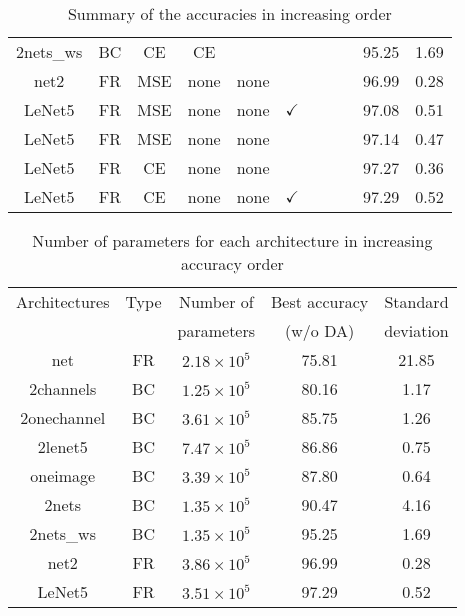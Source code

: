 \documentclass[10pt,conference,compsocconf]{IEEEtran}
\newcommand{\xmark}{\ding{55}}
\begin{document}
\begin{table}[H]
\begin{tabular}{|c 	|c		|c  			|c 					|c 				|c  				|c 				|c 			|c				|c 			|c|}
	2nets\_ws	& BC 	& CE 		& CE 				& \checkmark		& \xmark			& \xmark 		& \xmark		& \xmark			& 95.25		& 1.69 \\
	net2			& FR 	& MSE 		& none 				& none 			& \xmark			& \xmark 		& \xmark		& \checkmark		& 96.99		& 0.28 \\ 
	LeNet5 		& FR 	& MSE 		& none 				& none 			& $\checkmark$ 	& \xmark 		& \xmark		& \checkmark		& 97.08 		& 0.51 \\
	LeNet5 		& FR 	& MSE 		& none 				& none 			& \xmark 		& \xmark 		& \xmark 	& \checkmark		& 97.14 		& 0.47 \\
	LeNet5 		& FR 	& CE 		& none 				& none 			& \xmark 		& \xmark 		& \xmark 	& \checkmark		& 97.27 		& 0.36 \\ %
	LeNet5 		& FR 	& CE 		& none 				& none 			& $\checkmark$ 	& \xmark 		& \xmark		& \checkmark		& 97.29 		& 0.52 \\ 
  \hline
\end{tabular}
\caption{Summary of the accuracies in increasing order}
\label{tab:summary}
\end{table}

\begin{table}[H]
\begin{tabular}{|c 	|c		|c  					|c 				|c|}
  \hline
	Architectures 	& Type	& Number of			& Best accuracy 	& Standard \\
				&		& parameters			& (w/o DA)		& deviation \\
  \hline
	net	 		& FR		& $2.18 \times 10^{5}$ 	& 75.81 			& 21.85 \\
	2channels	& BC 	& $1.25 \times 10^{5}$ 	& 80.16			& 1.17 \\
	2onechannel	& BC	& $3.61 \times 10^{5}$  & 85.75			& 1.26 \\ %
	2lenet5		& BC	& $7.47 \times 10^{5}$  & 86.86			& 0.75 \\
	oneimage	& BC	& $3.39 \times 10^{5}$  & 87.80			& 0.64 \\
	2nets 		& BC 	& $1.35 \times 10^{5}$ 	& 90.47 			& 4.16 \\
	2nets\_ws	& BC 	& $1.35 \times 10^{5}$	& 95.25			& 1.69 \\ %
	net2			& FR 	& $3.86 \times 10^{5}$ 	& 96.99			& 0.28 \\ 
	LeNet5 		& FR 	& $3.51 \times 10^{5}$ 	& 97.29 			& 0.52 \\ 
  \hline
\end{tabular}
\caption{Number of parameters for each architecture in increasing accuracy order}
\label{tab:summary}
\end{table}
\end{document}
